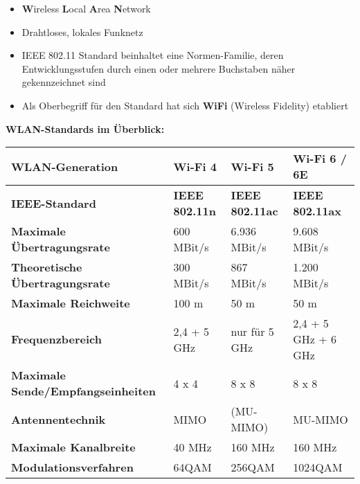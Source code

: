 \documentclass[asp1.tex]{subfiles}
\begin{document}
\begin{itemize}
    \item \textbf{W}ireless \textbf{L}ocal \textbf{A}rea \textbf{N}etwork
    \item Drahtloses, lokales Funknetz
    \item IEEE 802.11 Standard beinhaltet eine Normen-Familie, deren Entwicklungsstufen durch einen oder mehrere Buchstaben näher gekennzeichnet sind
    \item Als Oberbegriff für den Standard hat sich \textbf{WiFi} (Wireless Fidelity) etabliert
\end{itemize}

\break

\textbf{WLAN-Standards im Überblick:}
\begin{table}[H]
    \centering
    \begin{tabular}{|p{}||p{}|p{}|p{}|}
    \hline
        \textbf{WLAN-Generation}&\textbf{Wi-Fi 4}&\textbf{Wi-Fi 5}&W\textbf{i-Fi 6 / 6E} \\\hline

        \textbf{IEEE-Standard}&\textbf{IEEE 802.11n}&\textbf{IEEE 802.11ac}&\textbf{IEEE 802.11ax}  \\\hline

        \hline

        \textbf{Maximale Übertragungsrate}&600 MBit/s&6.936 MBit/s&9.608 MBit/s \\\hline

        \textbf{Theoretische Übertragungsrate}&300 MBit/s&867 MBit/s&1.200 MBit/s \\\hline

        \textbf{Maximale Reichweite}&100 m&50 m&50 m \\\hline

        \textbf{Frequenzbereich}&2,4 + 5 GHz&nur für 5 GHz&2,4 + 5 GHz + 6 GHz \\\hline

        \textbf{Maximale Sende/Empfangseinheiten}&4 x 4&8 x 8&8 x 8 \\\hline

        \textbf{Antennentechnik}&MIMO&(MU-MIMO)&MU-MIMO \\\hline

        \textbf{Maximale Kanalbreite}&40 MHz&160 MHz&160 MHz \\\hline

        \textbf{Modulationsverfahren}&64QAM&256QAM&1024QAM

        \\\hline
    \end{tabular}
\end{table}
\end{document}

